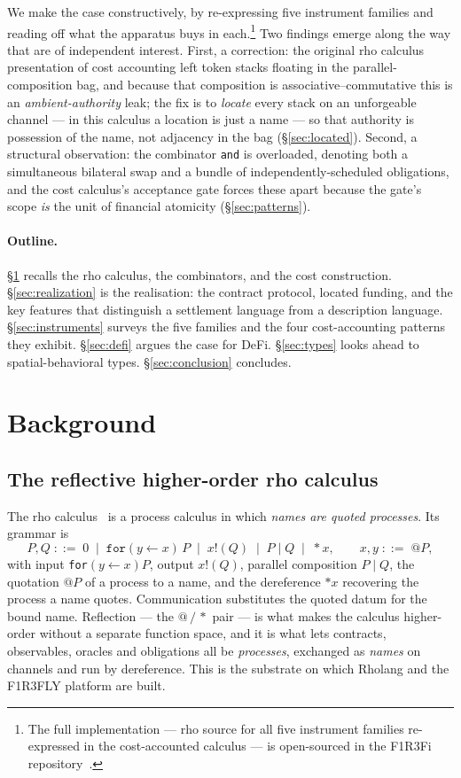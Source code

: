\documentclass[11pt]{article}
\theoremstyle{definition}
\theoremstyle{plain}
\newcommand{\rcalc}{rho calculus}
\begin{document}
We make the case constructively, by re-expressing five instrument families and reading off what the
apparatus buys in each.\footnote{The full implementation --- rho source for all five instrument
families re-expressed in the cost-accounted calculus --- is open-sourced in the F1R3Fi
repository~\cite{F1R3Fi}.} Two findings emerge along the way that are of independent interest. First, a
correction: the original \rcalc{} presentation of cost accounting left token stacks floating in the
parallel-composition bag, and because that composition is associative--commutative this is an
\emph{ambient-authority} leak; the fix is to \emph{locate} every stack on an unforgeable channel ---
in this calculus a location is just a name --- so that authority is possession of the name, not
adjacency in the bag (\S\ref{sec:located}). Second, a structural observation: the combinator \texttt{and} is overloaded,
denoting both a simultaneous bilateral swap and a bundle of independently-scheduled obligations, and
the cost calculus's acceptance gate forces these apart because the gate's scope \emph{is} the unit of
financial atomicity (\S\ref{sec:patterns}).

\paragraph{Outline.} \S\ref{sec:background} recalls the \rcalc, the combinators, and the cost
construction. \S\ref{sec:realization} is the realisation: the contract protocol, located funding,
and the key features that distinguish a settlement language from a description language.
\S\ref{sec:instruments} surveys the five families and the four cost-accounting patterns they exhibit.
\S\ref{sec:defi} argues the case for DeFi. \S\ref{sec:types} looks ahead to spatial-behavioral types.
\S\ref{sec:conclusion} concludes.

\section{Background}\label{sec:background}

\subsection{The reflective higher-order \rcalc}

The \rcalc~\cite{MeredithRadestock2005a} is a process calculus in which \emph{names are quoted
processes}. Its grammar is
\[
P, Q \;::=\; 0 \;\mid\; \texttt{for}(y \leftarrow x)\,P \;\mid\; x!(Q) \;\mid\; P \mid Q \;\mid\; {*}x,
\qquad x, y \;::=\; @P,
\]
with input \texttt{for}$(y\leftarrow x)P$, output $x!(Q)$, parallel composition $P \mid Q$,
the quotation $@P$ of a process to a name, and the dereference ${*}x$ recovering the process a name
quotes. Communication substitutes the quoted datum for the bound name. Reflection --- the
$@\,/\,{*}$ pair --- is what makes the calculus higher-order without a separate function space, and it
is what lets contracts, observables, oracles and obligations all be \emph{processes}, exchanged as
\emph{names} on channels and run by dereference. This is the substrate on which Rholang and the
F1R3FLY platform are built.
\end{document}

